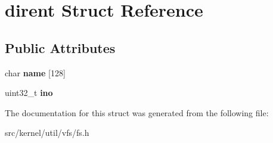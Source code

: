 \hypertarget{structdirent}{}\section{dirent Struct Reference}
\label{structdirent}
\subsection*{Public Attributes}
\begin{DoxyCompactItemize}
\item 
\mbox{\label{structdirent_abb2093f2917192e693a5651c50f555d5}} 
char {\bfseries name} \mbox{[}128\mbox{]}
\item 
\mbox{\label{structdirent_ac825d54b4201eb1f4d683bb3432514a6}} 
uint32\+\_\+t {\bfseries ino}
\end{DoxyCompactItemize}


The documentation for this struct was generated from the following file\+:\begin{DoxyCompactItemize}
\item 
src/kernel/util/vfs/fs.\+h\end{DoxyCompactItemize}

